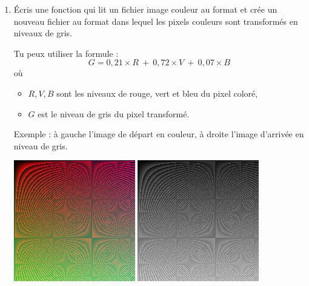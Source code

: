 \documentclass[11pt,class=report,crop=false]{standalone}
\begin{document}
\begin{activite}
\begin{enumerate}
\item Écris une fonction  qui lit un fichier image couleur au format  et crée un nouveau fichier au format  dans lequel les pixels couleurs sont transformés en niveaux de gris. 

Tu peux utiliser la formule :
$$G = 0,21 \times R \  + \  0,72 \times V \  + \  0,07 \times B$$
où
\begin{itemize}
  \item $R,V,B$ sont les niveaux de rouge, vert et bleu du pixel coloré,
  \item $G$ est le niveau de gris du pixel transformé.
\end{itemize}

Exemple : à gauche l'image de départ en couleur, à droite l'image d'arrivée en niveau de gris.
\begin{center}
\includegraphics[scale=\myscale,scale=0.5]{ecran-image_coul}\qquad\qquad
\includegraphics[scale=\myscale,scale=0.5]{ecran-image_coul_gris}
\end{center} 


\end{enumerate}   
     
\end{activite}


\end{document}
